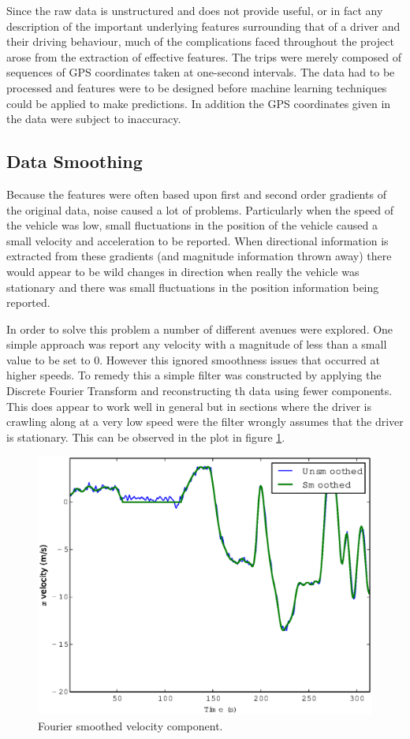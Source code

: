 \documentclass[a4paper, 11pt, twocolumn]{report}
\begin{document}
Since the raw data is unstructured and does not provide useful, or in fact any description of the important underlying features surrounding that of a driver and their driving behaviour, much of the complications faced throughout the project arose from the extraction of effective features.
The trips were merely composed of sequences of GPS coordinates taken at one-second intervals.
The data had to be processed and features were to be designed before machine learning techniques could be applied to make predictions.
In addition the GPS coordinates given in the data were subject to inaccuracy.


\subsection{Data Smoothing}
Because the features were often based upon first and second order gradients of the original data, noise caused a lot of problems.
Particularly when the speed of the vehicle was low, small fluctuations in the position of the vehicle caused a small velocity and acceleration to be reported.
When directional information is extracted from these gradients (and magnitude information thrown away) there would appear to be wild changes in direction when really the vehicle was stationary and there was small fluctuations in the position information being reported.

In order to solve this problem a number of different avenues were explored.
One simple approach was report any velocity with a magnitude of less than a small value to be set to 0.
However this ignored smoothness issues that occurred at higher speeds.
To remedy this a simple filter was constructed by applying the Discrete Fourier Transform and reconstructing th data using fewer components.
This does appear to work well in general but in sections where the driver is crawling along at a very low speed were the filter wrongly assumes that the driver is stationary.
This can be observed in the plot in figure \ref{fig:fouriersmooth}.

\begin{figure}[h]
    \center
    \includegraphics[width=\linewidth]{img/fouriersmooth}
    \caption{Fourier smoothed velocity component.}
    \label{fig:fouriersmooth}
\end{figure}
\end{document}
